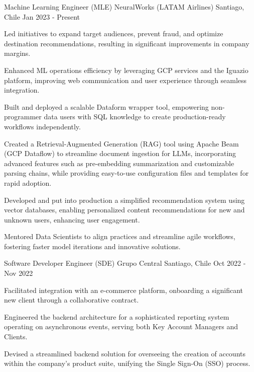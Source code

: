   \cventry
  {Machine Learning Engineer (MLE)}
  {NeuralWorks (LATAM Airlines)}
  {Santiago, Chile}
  {Jan 2023 - Present}
  {
  \begin{cvitems} %
    \item Led initiatives to expand target audiences, prevent fraud, and optimize destination recommendations, resulting in significant improvements in company margins.
    \item Enhanced ML operations efficiency by leveraging GCP services and the Iguazio platform, improving web communication and user experience through seamless integration.
    \item Built and deployed a scalable Dataform wrapper tool, empowering non-programmer data users with SQL knowledge to create production-ready workflows independently.
    \item Created a Retrieval-Augmented Generation (RAG) tool using Apache Beam (GCP Dataflow) to streamline document ingestion for LLMs, incorporating advanced features such as pre-embedding summarization and customizable parsing chains, while providing easy-to-use configuration files and templates for rapid adoption.
    \item Developed and put into production a simplified recommendation system using vector databases, enabling personalized content recommendations for new and unknown users, enhancing user engagement.
    \item Mentored Data Scientists to align practices and streamline agile workflows, fostering faster model iterations and innovative solutions.
  \end{cvitems}
  }

  \cventry
  {Software Developer Engineer (SDE)}
  {Grupo Central}
  {Santiago, Chile}
  {Oct 2022 - Nov 2022}
  {
  \begin{cvitems}
    \item Facilitated integration with an e-commerce platform, onboarding a significant new client through a collaborative contract.
    \item Engineered the backend architecture for a sophisticated reporting system operating on asynchronous events, serving both Key Account Managers and Clients.
    \item Devised a streamlined backend solution for overseeing the creation of accounts within the company's product suite, unifying the Single Sign-On (SSO) process.
  \end{cvitems}
  }

